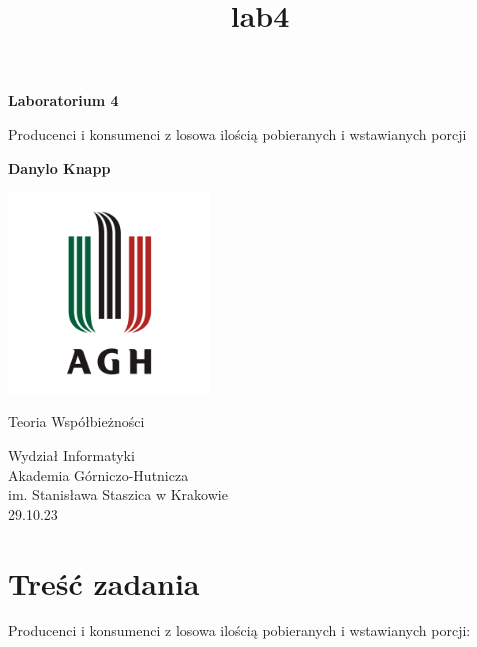 \documentclass[11pt]{article}
\title{lab4}
\begin{document}
    
\begin{titlepage}
    \begin{center}
        \vspace*{1cm}
 
        \textbf{Laboratorium 4}
 
        \vspace{0.5cm}
        Producenci i konsumenci z losowa ilością pobieranych i wstawianych porcji
             
        \vspace{1.5cm}
 
        \textbf{Danylo Knapp}

        \vfill

        \includegraphics[width=0.4\textwidth]{../report-templates/agh-logo.png}
 
        \vfill
             
        Teoria Współbieżności
             
        \vspace{0.8cm}

        Wydział Informatyki\\
        Akademia Górniczo-Hutnicza\\
        im. Stanisława Staszica w Krakowie\\
        29.10.23
             
    \end{center}
\end{titlepage}
    
    

    
    \hypertarget{treux15bux107-zadania}{%
\section{Treść zadania}\label{treux15bux107-zadania}}

Producenci i konsumenci z losowa ilością pobieranych i wstawianych
porcji:
\end{document}
